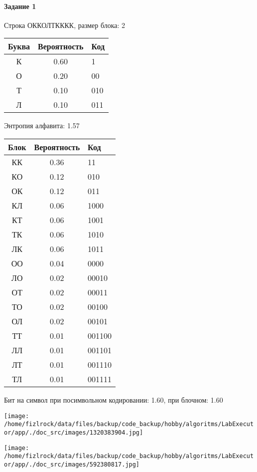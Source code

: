 \documentclass[a4paper, 12pt]{article}
\begin{document}
\paragraph{Задание 1}

Строка ОККОЛТКККК, размер блока: 2
\begin{center}
 \begin{tabular}{ |c|c|l| } 
  \hline
     Буква & Вероятность & Код\\ \hline
К & 0.60 & 1\\\hline
О & 0.20 & 00\\\hline
Т & 0.10 & 010\\\hline
Л & 0.10 & 011
\\ \hline \end{tabular}
\end{center}
Энтропия алфавита: 1.57
\begin{center}
 \begin{tabular}{ |c|c|l| } 
  \hline
     Блок & Вероятность & Код\\ \hline
КК & 0.36 & 11\\\hline
КО & 0.12 & 010\\\hline
ОК & 0.12 & 011\\\hline
КЛ & 0.06 & 1000\\\hline
КТ & 0.06 & 1001\\\hline
ТК & 0.06 & 1010\\\hline
ЛК & 0.06 & 1011\\\hline
ОО & 0.04 & 0000\\\hline
ЛО & 0.02 & 00010\\\hline
ОТ & 0.02 & 00011\\\hline
ТО & 0.02 & 00100\\\hline
ОЛ & 0.02 & 00101\\\hline
ТТ & 0.01 & 001100\\\hline
ЛЛ & 0.01 & 001101\\\hline
ЛТ & 0.01 & 001110\\\hline
ТЛ & 0.01 & 001111
\\ \hline \end{tabular}
\end{center}
Бит на символ при посимвольном кодировании: 1.60, при блочном: 1.60

\texttt{[image: /home/fizlrock/data/files/backup/code\_backup/hobby/algoritms/LabExecutor/app/./doc\_src/images/1320383904.jpg]}

\texttt{[image: /home/fizlrock/data/files/backup/code\_backup/hobby/algoritms/LabExecutor/app/./doc\_src/images/592380817.jpg]}
\pagebreak
\end{document}

